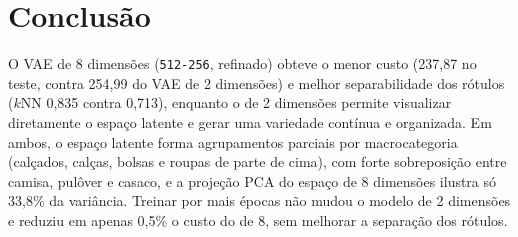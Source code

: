 \documentclass[11pt,a4paper]{article}
\begin{document}
\section{Conclusão}

O VAE de 8 dimensões (\texttt{512-256}, refinado) obteve o menor custo (237,87 no teste, contra 254,99 do VAE de 2 dimensões) e melhor separabilidade dos rótulos ($k$NN 0,835 contra 0,713), enquanto o de 2 dimensões permite visualizar diretamente o espaço latente e gerar uma variedade contínua e organizada. Em ambos, o espaço latente forma agrupamentos parciais por macrocategoria (calçados, calças, bolsas e roupas de parte de cima), com forte sobreposição entre camisa, pulôver e casaco, e a projeção PCA do espaço de 8 dimensões ilustra só 33,8\% da variância. Treinar por mais épocas não mudou o modelo de 2 dimensões e reduziu em apenas 0,5\% o custo do de 8, sem melhorar a separação dos rótulos.
\end{document}
